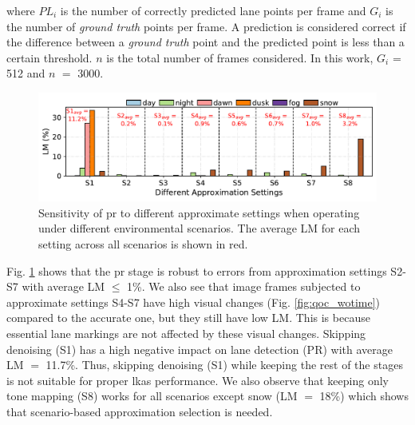 where $PL_{i}$ is the number of correctly predicted lane points per frame and $G_{i}$ is the number of \textit{ground truth} points per frame. A prediction is considered correct if the difference between a \textit{ground truth} point and the predicted point is less than a certain threshold. $n$ is the total number of frames considered. In this work, $G_{i}$ = 512 and $n$ $=$ 3000. 
\begin{figure}[ht]
    \centering
    \includegraphics[width= \textwidth]{figs/lane_mispredict.pdf}
    \captionsetup{width=0.9\linewidth}
    \caption{{Sensitivity of \gls{pr} to different approximate settings when operating under different environmental scenarios. The average LM for each setting across all scenarios is shown in red.}}
    \label{fig:lm}
\end{figure}
Fig. \ref{fig:lm} shows that the \gls{pr} stage is robust to errors from approximation settings S2-S7 with average LM $\leq$ 1\%. We also see that image frames subjected to approximate settings S4-S7 have high visual changes (Fig. \ref{fig:qoc_wotime}) compared to the accurate one, but they still have low LM. This is because essential lane markings are not affected by these visual changes. Skipping denoising (S1) has a high negative impact on lane detection (PR) with average LM $=$ 11.7\%. Thus, skipping denoising (S1) while keeping the rest of the stages is not suitable for proper \gls{lkas} performance. We also observe that keeping only tone mapping (S8) works for all scenarios except snow (LM $=$ 18\%) which shows that scenario-based approximation selection is needed. 
  
